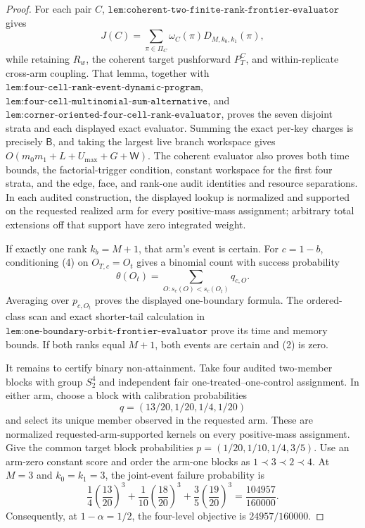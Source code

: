 \documentclass{article}
\begin{document}
\begin{proof}
For each pair \(C\), \(\texttt{lem:coherent-two-finite-rank-frontier-evaluator}\) gives
\[
J(C)=\sum_{\pi\in\Pi_C}\omega_C(\pi)D_{M,k_0,k_1}(\pi),
\tag{5}
\]
while retaining \(R_w\), the coherent target pushforward \(P_T^C\), and within-replicate cross-arm coupling. That lemma, together with \(\texttt{lem:four-cell-rank-event-dynamic-program}\), \(\texttt{lem:four-cell-multinomial-sum-alternative}\), and \(\texttt{lem:corner-oriented-four-cell-rank-evaluator}\), proves the seven disjoint strata and each displayed exact evaluator. Summing the exact per-key charges is precisely \(\mathsf B\), and taking the largest live branch workspace gives \(O(m_0m_1+L+U_{\max}+G+\mathsf W)\). The coherent evaluator also proves both time bounds, the factorial-trigger condition, constant workspace for the first four strata, and the edge, face, and rank-one audit identities and resource separations. In each audited construction, the displayed lookup is normalized and supported on the requested realized arm for every positive-mass assignment; arbitrary total extensions off that support have zero integrated weight.

If exactly one rank \(k_b=M+1\), that arm's event is certain. For \(c=1-b\), conditioning (4) on \(O_{T,c}=O_t\) gives a binomial count with success probability
\[
\theta(O_t)=\sum_{O:s_c(O)<s_c(O_t)}q_{c,O}.
\tag{6}
\]
Averaging over \(p_{c,O_t}\) proves the displayed one-boundary formula. The ordered-class scan and exact shorter-tail calculation in \(\texttt{lem:one-boundary-orbit-frontier-evaluator}\) prove its time and memory bounds. If both ranks equal \(M+1\), both events are certain and (2) is zero.

It remains to certify binary non-attainment. Take four audited two-member blocks with group \(S_2^4\) and independent fair one-treated--one-control assignment. In either arm, choose a block with calibration probabilities
\[
q=(13/20,1/20,1/4,1/20)
\tag{7}
\]
and select its unique member observed in the requested arm. These are normalized requested-arm-supported kernels on every positive-mass assignment. Give the common target block probabilities \(p=(1/20,1/10,1/4,3/5)\). Use an arm-zero constant score and order the arm-one blocks as \(1\prec3\prec2\prec4\). At \(M=3\) and \(k_0=k_1=3\), the joint-event failure probability is
\[
\frac14\left(\frac{13}{20}\right)^3+\frac1{10}\left(\frac{18}{20}\right)^3+\frac35\left(\frac{19}{20}\right)^3=\frac{104957}{160000}.
\tag{8}
\]
Consequently, at \(1-\alpha=1/2\), the four-level objective is \(24957/160000\).


\end{proof}
\end{document}
